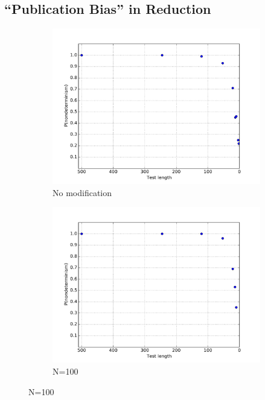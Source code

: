 \subsection{``Publication Bias'' in Reduction}
\label{sec:pubbias}

\begin{figure}
\centering 
\begin{subfigure}{0.30\columnwidth}
\centering
\includegraphics[width=\columnwidth]{lengthddmin}
\caption{No modification}
\label{fig:p1}
\end{subfigure}
\begin{subfigure}{0.30\columnwidth}
\centering
\includegraphics[width=\columnwidth]{lengthddminforcep}
\caption{N=100}
\label{fig:p2}

\end{subfigure}
\end{figure}
